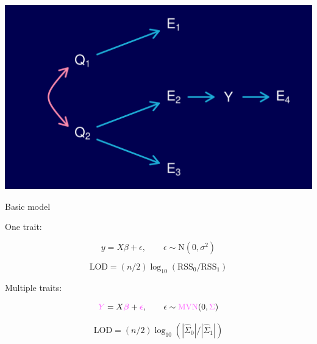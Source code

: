 \documentclass[12pt]{article}
\newcommand{\headsize}{\fontsize{35}{35} \selectfont}
\newcommand{\smallsize}{\fontsize{25}{30} \selectfont}
\begin{document}
\vspace{22.3mm}

\centerline{\includegraphics{Figs/causal_network.pdf}}



\newpage

\addtocounter{page}{-1}


\headsize \color{myyellow}
\hfill \begin{minipage}{5.75in}
\centering
Basic model
\end{minipage}

\vspace{25mm}

\color{white} \smallsize

One trait:

\vspace{-18pt}

{\color{myblue} $$ y = X \beta + \epsilon, \qquad \epsilon \sim \text{N}(0, \sigma^2) $$}

\vspace{-8pt}

{\color{mybgcolor} $$ \text{LOD} = (n/2) \log_{10} ( \text{RSS}_0 /
  \text{RSS}_1 ) $$ }

\vspace{15mm}

Multiple traits:

\vspace{-18pt}

{\color{myblue} $$ {\color{mypink} Y} = X {\color{mypink}
    \boldsymbol{\beta}} + {\color{mypink} \boldsymbol{\epsilon}},
  \qquad \epsilon \sim \text{\color{mypink} MVN}(0, {\color{mypink} \Sigma}) $$ }

\vspace{-8pt}

{\color{mybgcolor} $$ \text{LOD} = (n/2) \log_{10} ( {|\hat{\Sigma}_0|} /
  { |\hat{\Sigma}_1|}) $$ }
\end{document}
